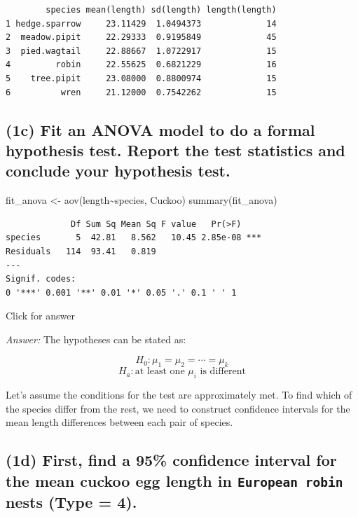 \documentclass[
]{book}
\newenvironment{Shaded}{\begin{snugshade}}{\end{snugshade}}
\newcommand{\FunctionTok}[1]{\textcolor[rgb]{0.00,0.00,0.00}{#1}}
\newcommand{\NormalTok}[1]{#1}
\newcommand{\OtherTok}[1]{\textcolor[rgb]{0.56,0.35,0.01}{#1}}
\newcommand{\SpecialCharTok}[1]{\textcolor[rgb]{0.00,0.00,0.00}{#1}}
\begin{document}
\begin{verbatim}
        species mean(length) sd(length) length(length)
1 hedge.sparrow     23.11429  1.0494373             14
2  meadow.pipit     22.29333  0.9195849             45
3  pied.wagtail     22.88667  1.0722917             15
4         robin     22.55625  0.6821229             16
5    tree.pipit     23.08000  0.8800974             15
6          wren     21.12000  0.7542262             15
\end{verbatim}

\hypertarget{c-fit-an-anova-model-to-do-a-formal-hypothesis-test.-report-the-test-statistics-and-conclude-your-hypothesis-test.}{%
\subsection{(1c) Fit an ANOVA model to do a formal hypothesis test. Report the test statistics and conclude your hypothesis test.}\label{c-fit-an-anova-model-to-do-a-formal-hypothesis-test.-report-the-test-statistics-and-conclude-your-hypothesis-test.}}

\begin{Shaded}
\begin{Highlighting}[]
\NormalTok{fit\_anova }\OtherTok{\textless{}{-}} \FunctionTok{aov}\NormalTok{(length}\SpecialCharTok{\textasciitilde{}}\NormalTok{species, Cuckoo)}
\FunctionTok{summary}\NormalTok{(fit\_anova)}
\end{Highlighting}
\end{Shaded}

\begin{verbatim}
             Df Sum Sq Mean Sq F value   Pr(>F)    
species       5  42.81   8.562   10.45 2.85e-08 ***
Residuals   114  93.41   0.819                     
---
Signif. codes:  
0 '***' 0.001 '**' 0.01 '*' 0.05 '.' 0.1 ' ' 1
\end{verbatim}

Click for answer

\emph{Answer:} The hypotheses can be stated as:

\[H_0:\mu_1 = \mu_2 = \cdots = \mu_k\]
\[H_a: \text{at least one } \mu_i \text{ is different}\]

Let's assume the conditions for the test are approximately met. To find which of the species differ from the rest, we need to construct confidence intervals for the mean length differences between each pair of species.

\hypertarget{d-first-find-a-95-confidence-interval-for-the-mean-cuckoo-egg-length-in-european-robin-nests-type-4.}{%
\subsection{\texorpdfstring{(1d) First, find a 95\% confidence interval for the mean cuckoo egg length in \texttt{European\ robin} nests (Type = 4).}{(1d) First, find a 95\% confidence interval for the mean cuckoo egg length in European robin nests (Type = 4).}}\label{d-first-find-a-95-confidence-interval-for-the-mean-cuckoo-egg-length-in-european-robin-nests-type-4.}}
\end{document}
